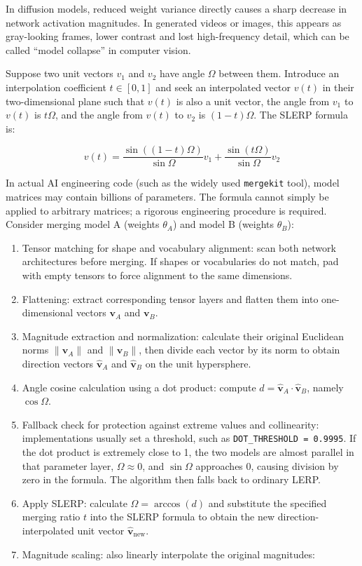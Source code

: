 In diffusion models, reduced weight variance directly causes a sharp decrease in network activation magnitudes. In generated videos or images, this appears as gray-looking frames, lower contrast and lost high-frequency detail, which can be called ``model collapse'' in computer vision.

Suppose two unit vectors \(v_1\) and \(v_2\) have angle \(\Omega\) between them. Introduce an interpolation coefficient \(t\in[0,1]\) and seek an interpolated vector \(v(t)\) in their two-dimensional plane such that \(v(t)\) is also a unit vector, the angle from \(v_1\) to \(v(t)\) is \(t\Omega\), and the angle from \(v(t)\) to \(v_2\) is \((1-t)\Omega\). The SLERP formula is:

\[
v(t)=\frac{\sin((1-t)\Omega)}{\sin\Omega}v_1+\frac{\sin(t\Omega)}{\sin\Omega}v_2
\]

In actual AI engineering code (such as the widely used \texttt{mergekit} tool), model matrices may contain billions of parameters. The formula cannot simply be applied to arbitrary matrices; a rigorous engineering procedure is required. Consider merging model A (weights \(\theta_A\)) and model B (weights \(\theta_B\)):

\begin{enumerate}
\def\labelenumi{\arabic{enumi}.}
\item
  Tensor matching for shape and vocabulary alignment: scan both network architectures before merging. If shapes or vocabularies do not match, pad with empty tensors to force alignment to the same dimensions.
\item
  Flattening: extract corresponding tensor layers and flatten them into one-dimensional vectors \(\mathbf{v}_A\) and \(\mathbf{v}_B\).
\item
  Magnitude extraction and normalization: calculate their original Euclidean norms \(\|\mathbf{v}_A\|\) and \(\|\mathbf{v}_B\|\), then divide each vector by its norm to obtain direction vectors \(\hat{\mathbf{v}}_A\) and \(\hat{\mathbf{v}}_B\) on the unit hypersphere.
\item
  Angle cosine calculation using a dot product: compute \(d=\hat{\mathbf{v}}_A\cdot\hat{\mathbf{v}}_B\), namely \(\cos\Omega\).
\item
  Fallback check for protection against extreme values and collinearity: implementations usually set a threshold, such as \texttt{DOT\_THRESHOLD\ =\ 0.9995}. If the dot product is extremely close to 1, the two models are almost parallel in that parameter layer, \(\Omega\approx 0\), and \(\sin\Omega\) approaches 0, causing division by zero in the formula. The algorithm then falls back to ordinary LERP.
\item
  Apply SLERP: calculate \(\Omega=\arccos(d)\) and substitute the specified merging ratio \(t\) into the SLERP formula to obtain the new direction-interpolated unit vector \(\hat{\mathbf{v}}_{\mathrm{new}}\).
\item
{}
  Magnitude scaling: also linearly interpolate the original magnitudes:
\end{enumerate}

